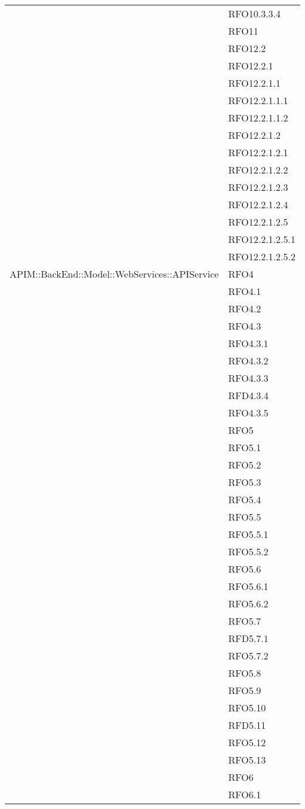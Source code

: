 \begin{longtable}{ p{12cm} | p{4cm} }
& RFO10.3.3.4 \\
		    & RFO11 \\
		    & RFO12.2 \\
& RFO12.2.1 \\
& RFO12.2.1.1 \\
& RFO12.2.1.1.1 \\
& RFO12.2.1.1.2 \\
& RFO12.2.1.2 \\
& RFO12.2.1.2.1 \\
& RFO12.2.1.2.2 \\
& RFO12.2.1.2.3 \\
& RFO12.2.1.2.4 \\
& RFO12.2.1.2.5 \\
& RFO12.2.1.2.5.1 \\
& RFO12.2.1.2.5.2 \\
		    \hline
		    APIM::BackEnd::Model::WebServices::APIService
		    & RFO4 \\
		    & RFO4.1 \\
		    & RFO4.2 \\
		    & RFO4.3 \\
		    & RFO4.3.1 \\
		    & RFO4.3.2 \\
		    & RFO4.3.3 \\
		    & RFD4.3.4 \\
		    & RFO4.3.5 \\
		    & RFO5 \\
& RFO5.1 \\
& RFO5.2 \\
& RFO5.3 \\
& RFO5.4 \\
& RFO5.5 \\
& RFO5.5.1 \\
& RFO5.5.2 \\
& RFO5.6\\
& RFO5.6.1 \\
& RFO5.6.2 \\
& RFO5.7 \\
& RFD5.7.1 \\
& RFO5.7.2 \\
& RFO5.8 \\
& RFO5.9 \\
& RFO5.10 \\
& RFD5.11 \\
& RFO5.12 \\
& RFO5.13 \\
& RFO6 \\
& RFO6.1 \\

\end{longtable}
